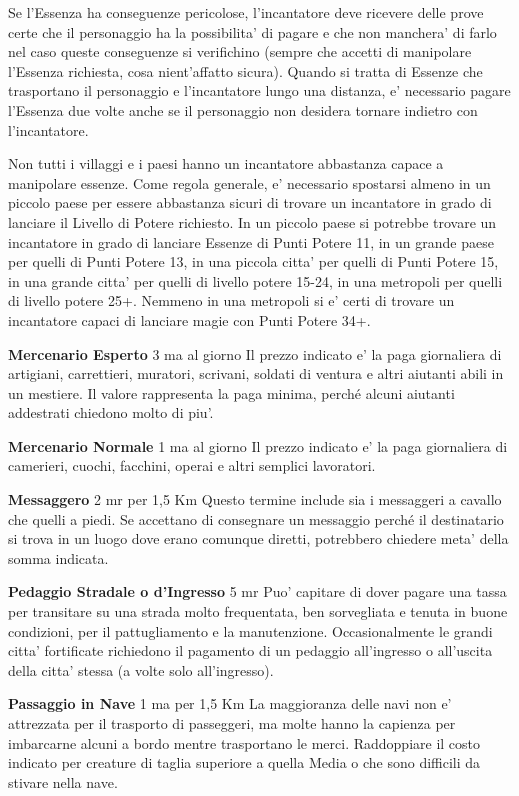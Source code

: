 \documentclass[a4paper,11pt,twoside,openany]{book}
\begin{document}
{Se l'Essenza ha conseguenze pericolose, l'incantatore deve ricevere delle prove certe che il personaggio ha la possibilita' di pagare e che non manchera' di farlo nel caso queste conseguenze si verifichino (sempre che accetti di manipolare l'Essenza richiesta, cosa nient'affatto sicura). Quando si tratta di Essenze che trasportano il personaggio e l'incantatore lungo una distanza, e' necessario pagare l'Essenza due volte anche se il personaggio non desidera tornare indietro con l'incantatore.

Non tutti i villaggi e i paesi hanno un incantatore abbastanza capace a manipolare essenze. Come regola generale, e' necessario spostarsi almeno in un piccolo paese per essere abbastanza sicuri di trovare un incantatore in grado di lanciare il Livello di Potere richiesto. In un piccolo paese si potrebbe trovare un incantatore in grado di lanciare Essenze di Punti Potere 11, in un grande paese per quelli di Punti Potere 13, in una piccola citta' per quelli di Punti Potere 15, in una grande citta' per quelli di livello potere 15-24, in una metropoli per quelli di livello potere 25+. Nemmeno in una metropoli si e' certi di trovare un incantatore capaci di lanciare magie con Punti Potere 34+. 

\textbf{Mercenario Esperto} 3 ma al giorno Il prezzo indicato e' la paga giornaliera di artigiani, carrettieri, muratori, scrivani, soldati di ventura e altri aiutanti abili in un mestiere. Il valore rappresenta la paga minima, perché alcuni aiutanti addestrati chiedono molto di piu'.

\textbf{Mercenario Normale} 1 ma al giorno Il prezzo indicato e' la paga giornaliera di camerieri, cuochi, facchini, operai e altri semplici lavoratori.

\textbf{Messaggero} 2 mr per 1,5 Km Questo termine include sia i messaggeri a cavallo che quelli a piedi. Se accettano di consegnare un messaggio perché il destinatario si trova in un luogo dove erano comunque diretti, potrebbero chiedere meta' della somma indicata.

\textbf{Pedaggio Stradale o d'Ingresso} 5 mr Puo' capitare di dover pagare una tassa per transitare su una strada molto frequentata, ben sorvegliata e tenuta in buone condizioni, per il pattugliamento e la manutenzione. Occasionalmente le grandi citta' fortificate richiedono il pagamento di un pedaggio all'ingresso o all'uscita della citta' stessa (a volte solo all'ingresso).

\textbf{Passaggio in Nave} 1 ma per 1,5 Km La maggioranza delle navi non e' attrezzata per il trasporto di passeggeri, ma molte hanno la capienza per imbarcarne alcuni a bordo mentre trasportano le merci. Raddoppiare il costo indicato per creature di taglia superiore a quella Media o che sono difficili da stivare nella nave.

}
\end{document}
